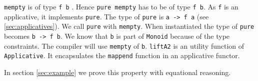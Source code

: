 \verb|mempty| is of type \verb|f b| . Hence \verb|pure mempty| has to be of type \verb|f b|.
As \verb|f| is an applicative, it implements \verb|pure|. The type of \verb|pure| is \verb|a -> f a| (see \ref{sec:applicatives}). We call \verb|pure| with \verb|mempty|. When instantiated the type of \verb|pure| becomes \verb|b -> f b|.  We know that \verb|b| is part of \verb|Monoid| because of the type constraints. The compiler will use \verb|mempty| of \verb|b|.  \verb|liftA2| is an utility function of \verb|Applicative|. It encapsulates the \verb|mappend| function in an applicative functor. 

In section \ref{sec:example} we prove this property with equational reasoning.
